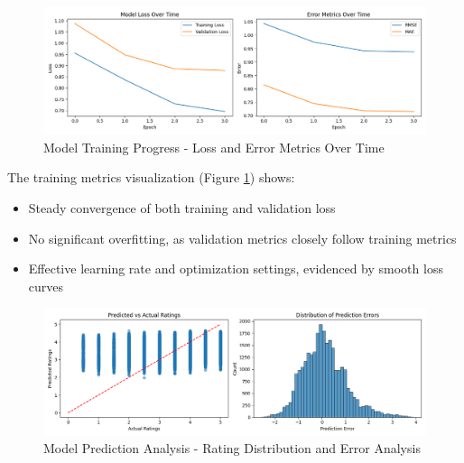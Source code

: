 \documentclass[12pt]{article}
\begin{document}
\begin{figure}[h]
    \centering
    \includegraphics[width=\textwidth]{training_metrics.png}
    \caption{Model Training Progress - Loss and Error Metrics Over Time}
    \label{fig:training_metrics}
\end{figure}

The training metrics visualization (Figure \ref{fig:training_metrics}) shows:
\begin{itemize}
    \item Steady convergence of both training and validation loss
    \item No significant overfitting, as validation metrics closely follow training metrics
    \item Effective learning rate and optimization settings, evidenced by smooth loss curves
\end{itemize}

\begin{figure}[h]
    \centering
    \includegraphics[width=\textwidth]{prediction_analysis.png}
    \caption{Model Prediction Analysis - Rating Distribution and Error Analysis}
    \label{fig:prediction_analysis}
\end{figure}
\end{document}
